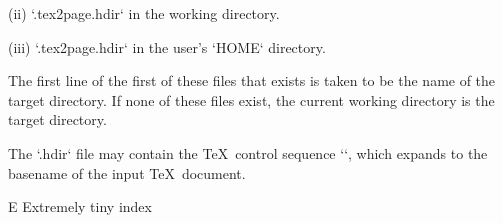 \item(ii) `.tex2page.hdir` in the working directory.

\item(iii) `.tex2page.hdir` in the user’s `HOME` directory.

\n The first line of the first of these files that exists
is taken to be the name of the target directory.  If none of
these files exist, the current working directory is the target
directory.

The `.hdir` file may contain the \TeX\ control
sequence `\jobname`, which expands to the basename of
the input \TeX\ document.

\beginchapter  E Extremely tiny index




\endmulticols


\bye
